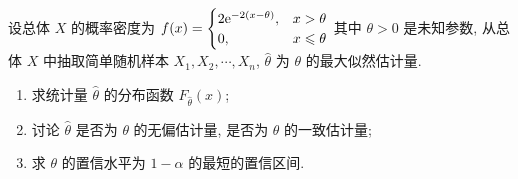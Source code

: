 \begin{example}
    设总体 $X$ 的概率密度为 $f(x)=\begin{cases}
        2\mathrm{e} ^{-2(x-\theta)}, & x>\theta\\ 0,& x\leqslant \theta
    \end{cases}$ 其中 $\theta>0$ 是未知参数, 从总体 $X$ 中抽取简单随机样本 $X_1, X_2, \cdots ,X_n$, $\hat{\theta}$ 为 $\theta$ 的最大似然估计量. 
    \begin{enumerate}[label=(\arabic{*})]
        \item 求统计量 $\hat{\theta}$ 的分布函数 $F_{\hat{\theta}}(x)$;
        \item 讨论 $\hat{\theta}$ 是否为 $\theta$ 的无偏估计量, 是否为 $\theta$ 的一致估计量;
        \item 求 $\theta$ 的置信水平为 $1-\alpha$ 的最短的置信区间.
    \end{enumerate}
\end{example}
